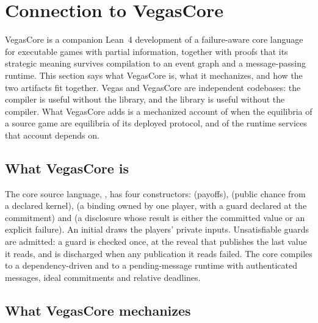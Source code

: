 \section{Connection to VegasCore}
\label{sec:vegascore}

VegasCore is a companion Lean~4 development
\citep{deMouraUllrich2021,mathlib2020} of a failure-aware core
language for executable games with partial information, together
with proofs that its strategic meaning survives compilation to an
event graph and a message-passing runtime.  This
section says what VegasCore is, what it mechanizes, and how the
two artifacts fit together.  Vegas and VegasCore are independent
codebases: the compiler is useful without the library, and the
library is useful without the compiler.  What VegasCore adds is
a mechanized account of when the equilibria of a source game are
equilibria of its deployed protocol, and of the runtime services
that account depends on.

\subsection{What VegasCore is}

The core source language, , has four
constructors:  (payoffs),  (public chance from a
declared kernel),  (a binding owned by one player, with
a guard declared at the commitment) and  (a disclosure
whose result is either the committed value or an explicit
failure).  An initial  draws the players' private
inputs.  Unsatisfiable guards are admitted: a guard is checked once,
at the reveal that publishes the last value it reads, and is
discharged when any publication it reads failed.  The core compiles
to a dependency-driven  and to a pending-message
runtime with authenticated messages, ideal commitments and relative
deadlines.

\subsection{What VegasCore mechanizes}
\label{sec:vegascore:theorems}

